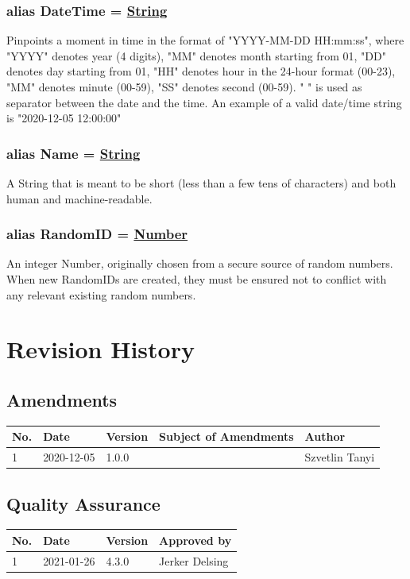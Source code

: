 \documentclass[a4paper]{arrowhead}
\newcommand{\pdef}[1]{{\textcolor{ArrowheadGrey}{#1 \label{sec:model:primitives:#1} \label{sec:model:primitives:#1s}}}}
\newcommand{\pref}[1]{{\textcolor{ArrowheadGrey}{\hyperref[sec:model:primitives:#1]{#1}}}}
\begin{document}
\subsubsection{alias \pdef{DateTime} = \pref{String}}

Pinpoints a moment in time in the format of "YYYY-MM-DD HH:mm:ss", where "YYYY" denotes year (4 digits), "MM" denotes month starting from 01, "DD" denotes day starting from 01, "HH" denotes hour in the 24-hour format (00-23), "MM" denotes minute (00-59), "SS" denotes second (00-59). " " is used as separator between the date and the time.
An example of a valid date/time string is "2020-12-05 12:00:00"

\subsubsection{alias \pdef{Name} = \pref{String}}

A String that is meant to be short (less than a few tens of characters) and both human and machine-readable.

\subsubsection{alias \pdef{RandomID} = \pref{Number}}

An integer Number, originally chosen from a secure source of random numbers. When new RandomIDs are created, they must be ensured not to conflict with any relevant existing random numbers.

\newpage




\newpage

\section{Revision History}
\subsection{Amendments}

\noindent\begin{tabularx}{\textwidth}{| p{1cm} | p{3cm} | p{2cm} | X | p{4cm} |} \hline
\rowcolor{gray!33} No. & Date & Version & Subject of Amendments & Author \\ \hline

1 & 2020-12-05 & 1.0.0 & & Szvetlin Tanyi \\ \hline

\end{tabularx}

\subsection{Quality Assurance}

\noindent\begin{tabularx}{\textwidth}{| p{1cm} | p{3cm} | p{2cm} | X |} \hline
\rowcolor{gray!33} No. & Date & Version & Approved by \\ \hline

1 & 2021-01-26  & 4.3.0 & Jerker Delsing\\ \hline

\end{tabularx}
\end{document}
